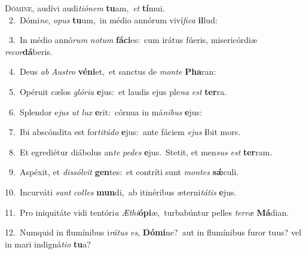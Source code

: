 \lettrine{\initial\textcolor{\initialcolor}{D}}{ómine,} audívi audi\-\textit{ti}\-\textit{ó}\textit{nem} \textbf{tu}\-am,~\star \textit{et} \textbf{tí}\-mui.\\
{\numbfont\textcolor{\numbcolor}{~2.}}~Dómi\-\textit{ne}\-, \textit{o}\-\textit{pus} \textbf{tu}\-um,~\star in médio annórum viví\-\textit{fi}\-\textit{ca} \textbf{il}\-lud:\par
{\numbfont\textcolor{\numbcolor}{~3.}}~In médio annó\textit{rum} \textit{no}\-\textit{tum} \textbf{fá}\-\textbf{ci}es:~\star cum irátus fúeris, misericórdiæ \textit{re}\-\textit{cor}\textbf{dá}beris.\par
{\numbfont\textcolor{\numbcolor}{~4.}}~Deus \textit{ab} \textit{Aus}\-\textit{tro} \textbf{vé}\-\textbf{ni}et,~\star et sanctus de \textit{mon}\-\textit{te} \textbf{Pha}\-ran:\par
{\numbfont\textcolor{\numbcolor}{~5.}}~Opéruit cælos \textit{gló}\-\textit{ri}\textit{a} \textbf{e}\-jus:~\star et laudis ejus ple\textit{na} \textit{est} \textbf{ter}\-ra.\par
{\numbfont\textcolor{\numbcolor}{~6.}}~Splendor e\textit{jus} \textit{ut} \textit{lux} \textbf{e}\-rit:~\star córnua in má\-\textit{ni}\-\textit{bus} \textbf{e}\-jus:\par
{\numbfont\textcolor{\numbcolor}{~7.}}~Ibi abscóndita est for\-\textit{ti}\-\textit{tú}\textit{do} \textbf{e}\-jus:~\star ante fáciem \textit{e}\-\textit{jus} \textbf{i}\-bit mors.\par
{\numbfont\textcolor{\numbcolor}{~8.}}~Et egrediétur diábolus an\textit{te} \textit{pe}\-\textit{des} \textbf{e}\-jus.~\star Stetit, et men\textit{sus} \textit{est} \textbf{ter}\-ram.\par
{\numbfont\textcolor{\numbcolor}{~9.}}~Aspéxit, et \textit{dis}\-\textit{sól}\textit{vit} \textbf{gen}\-tes:~\star et contríti sunt \textit{mon}\-\textit{tes} \textbf{sǽ}\-culi.\par
{\numbfont\textcolor{\numbcolor}{10.}}~Incurváti \textit{sunt} \textit{col}\-\textit{les} \textbf{mun}\-di,~\star ab itinéribus æterni\-\textit{tá}\-\textit{tis} \textbf{e}\-jus.\par
{\numbfont\textcolor{\numbcolor}{11.}}~Pro iniquitáte vidi tentóri\textit{a} \textit{Æ}\-\textit{thi}\textbf{ó}\textbf{pi}æ,~\star turbabúntur pelles \textit{ter}\-\textit{ræ} \textbf{Má}\-dian.\par
{\numbfont\textcolor{\numbcolor}{12.}}~Numquid in flumínibus i\-\textit{rá}\-\textit{tus} \textit{es}\-, \textbf{Dó}\-\textbf{mi}ne?~\star aut in flumínibus furor tuus? vel in mari indigná\-\textit{ti}\-\textit{o} \textbf{tu}\-a?\par
